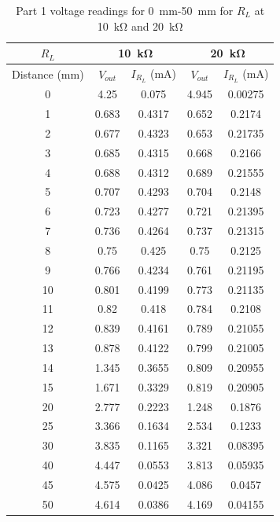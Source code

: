 \documentclass[CMPE]{../KGCOEReport}
\begin{document}
	\begin{table}[H]
        \renewcommand{\arraystretch}{1.2}
        \setlength{\tabcolsep}{12pt}
        \caption{Part 1 voltage readings for \SI{0}{\milli\metre}-\SI{50}{\milli\metre} for $R_L$ at \SI{10}{\kilo\ohm} and \SI{20}{\kilo\ohm}}
        \begin{center}
            \begin{tabular}{|c|c|c||c|c|}
                \hline
				$R_L$ & \multicolumn{2}{c||}{\SI{10}{\kilo\ohm}} & \multicolumn{2}{c|}{\SI{20}{\kilo\ohm}}\\\hline
				Distance (mm) & $V_{out}$ & $I_{R_L}$ (mA) & $V_{out}$ & $I_{R_L}$ (mA)\\\hline

0	& 4.25	& 0.075		& 4.945	& 0.00275\\\hline
1	& 0.683	& 0.4317	& 0.652	& 0.2174\\\hline
2	& 0.677	& 0.4323	& 0.653	& 0.21735\\\hline
3	& 0.685	& 0.4315	& 0.668	& 0.2166\\\hline
4	& 0.688	& 0.4312	& 0.689	& 0.21555\\\hline
5	& 0.707	& 0.4293	& 0.704	& 0.2148\\\hline
6	& 0.723	& 0.4277	& 0.721	& 0.21395\\\hline
7	& 0.736	& 0.4264	& 0.737	& 0.21315\\\hline
8	& 0.75	& 0.425		& 0.75	& 0.2125\\\hline
9	& 0.766	& 0.4234	& 0.761	& 0.21195\\\hline
10	& 0.801	& 0.4199	& 0.773	& 0.21135\\\hline
11	& 0.82	& 0.418		& 0.784	& 0.2108\\\hline
12	& 0.839	& 0.4161	& 0.789	& 0.21055\\\hline
13	& 0.878	& 0.4122	& 0.799	& 0.21005\\\hline
14	& 1.345	& 0.3655	& 0.809	& 0.20955\\\hline
15	& 1.671	& 0.3329	& 0.819	& 0.20905\\\hline
20	& 2.777	& 0.2223	& 1.248	& 0.1876\\\hline
25	& 3.366	& 0.1634	& 2.534	& 0.1233\\\hline
30	& 3.835	& 0.1165	& 3.321	& 0.08395\\\hline
40	& 4.447	& 0.0553	& 3.813	& 0.05935\\\hline
45	& 4.575	& 0.0425	& 4.086	& 0.0457\\\hline
50	& 4.614	& 0.0386	& 4.169	& 0.04155\\\hline

            \end{tabular}
        \end{center}
        \label{tab:p1}
    \end{table}
\end{document}
